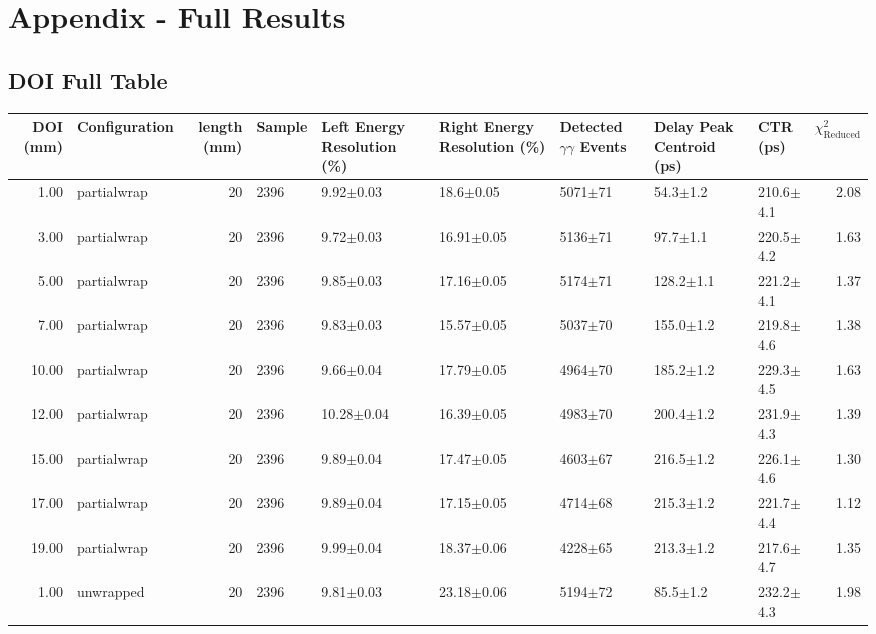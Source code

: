 \section*{Appendix - Full Results}

\subsection{DOI Full Table}
\begin{tabular}{rlrllllllr}
\hline
DOI (mm) & Configuration &  length (mm) & Sample & Left Energy Resolution (\%) & Right Energy Resolution (\%) & Detected $\gamma\gamma$ Events & Delay Peak Centroid (ps) & CTR (ps) &  $\chi^2_\text{Reduced}$ \\
\hline
      1.00 &   partialwrap &      20 &    2396 &        9.92$\pm$0.03 &    18.6$\pm$0.05 &  5071$\pm$71 &    54.3$\pm$1.2 &   210.6$\pm$4.1 &        2.08 \\
      3.00 &   partialwrap &      20 &    2396 &        9.72$\pm$0.03 &   16.91$\pm$0.05 &  5136$\pm$71 &    97.7$\pm$1.1 &   220.5$\pm$4.2 &        1.63 \\
      5.00 &   partialwrap &      20 &    2396 &        9.85$\pm$0.03 &   17.16$\pm$0.05 &  5174$\pm$71 &   128.2$\pm$1.1 &   221.2$\pm$4.1 &        1.37 \\
      7.00 &   partialwrap &      20 &    2396 &        9.83$\pm$0.03 &   15.57$\pm$0.05 &  5037$\pm$70 &   155.0$\pm$1.2 &   219.8$\pm$4.6 &        1.38 \\
     10.00 &   partialwrap &      20 &    2396 &        9.66$\pm$0.04 &   17.79$\pm$0.05 &  4964$\pm$70 &   185.2$\pm$1.2 &   229.3$\pm$4.5 &        1.63 \\
     12.00 &   partialwrap &      20 &    2396 &       10.28$\pm$0.04 &   16.39$\pm$0.05 &  4983$\pm$70 &   200.4$\pm$1.2 &   231.9$\pm$4.3 &        1.39 \\
     15.00 &   partialwrap &      20 &    2396 &        9.89$\pm$0.04 &   17.47$\pm$0.05 &  4603$\pm$67 &   216.5$\pm$1.2 &   226.1$\pm$4.6 &        1.30 \\
     17.00 &   partialwrap &      20 &    2396 &        9.89$\pm$0.04 &   17.15$\pm$0.05 &  4714$\pm$68 &   215.3$\pm$1.2 &   221.7$\pm$4.4 &        1.12 \\
     19.00 &   partialwrap &      20 &    2396 &        9.99$\pm$0.04 &   18.37$\pm$0.06 &  4228$\pm$65 &   213.3$\pm$1.2 &   217.6$\pm$4.7 &        1.35 \\
      1.00 &     unwrapped &      20 &    2396 &        9.81$\pm$0.03 &   23.18$\pm$0.06 &  5194$\pm$72 &    85.5$\pm$1.2 &   232.2$\pm$4.3 &        1.98 \\

\end{tabular}
